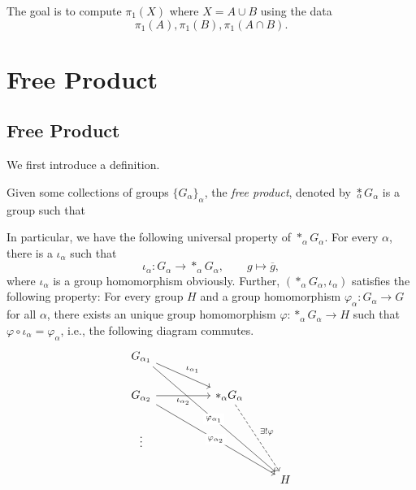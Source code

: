 The goal is to compute \(\pi _1(X)\) where \(X = A\cup B\) using the data
\[
	\pi _1(A), \pi _1(B), \pi _1(A\cap B).
\]

\section{Free Product}
\subsection{Free Product}
We first introduce a definition.
\begin{definition}\label{def:free-product}
	Given some collections of groups \(\{G_{\alpha }\}_{\alpha }\), the \emph{free product},
	denoted by \(\underset{\alpha}{\ast}G_{\alpha }\) is a group such that
\end{definition}
\begin{remark}
	In particular, we have the following universal property of \(\ast_\alpha G_\alpha \). For every \(\alpha \), there is a \(\iota _\alpha \) such that
	\[
		\iota _\alpha \colon G_\alpha \to \ast_\alpha G_\alpha ,\qquad g\mapsto \overline{g},
	\]
	where \(\iota _\alpha \) is a group homomorphism obviously. Further, \((\ast_\alpha G_\alpha ,\iota _\alpha )\) satisfies the following property: For every
	group \(H\) and a group homomorphism \(\varphi _\alpha \colon G_\alpha \to G\) for all \(\alpha \), there exists an unique group homomorphism \(\varphi \colon \ast_\alpha G_\alpha \to H\)
	such that \(\varphi \circ \iota _\alpha = \varphi _\alpha \), i.e., the following diagram commutes.
	\[
		\begin{tikzcd}
			{G_{\alpha_1}} \\
			{G_{\alpha_2}} && {\ast_\alpha G_\alpha} \\
			\vdots \\
			&&& H
			\arrow["{\iota_{\alpha_1}}", from=1-1, to=2-3]
			\arrow["{\iota_{\alpha_2}}"', from=2-1, to=2-3]
			\arrow["{\exists ! \varphi}", dashed, from=2-3, to=4-4]
			\arrow["{\varphi_{\alpha_1}}"{description}, from=1-1, to=4-4]
			\arrow["{\varphi_{\alpha_2}}"{description}, from=2-1, to=4-4]
		\end{tikzcd}
	\]
\end{remark}
